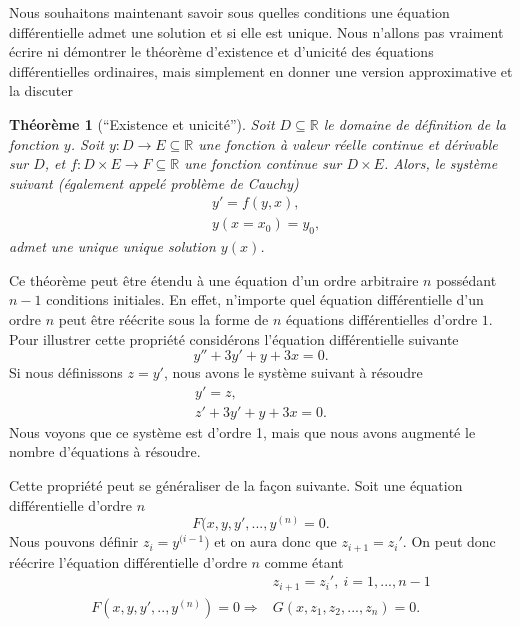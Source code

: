 \documentclass[a4paper,12pt]{book}
\newcommand{\real}{\mathbb{R}}
\newtheorem{theoreme}{Théorème}
\begin{document}
Nous souhaitons maintenant savoir sous quelles conditions une équation différentielle admet une solution 
et si elle est unique. Nous n'allons pas vraiment écrire ni démontrer le théorème 
d'existence et d'unicité des équations différentielles ordinaires, mais simplement en donner une 
version approximative et la discuter
\begin{theoreme}[``Existence et unicité'']
 Soit $D\subseteq\real$ le domaine de définition de la fonction $y$. Soit  
 $y:D\rightarrow E\subseteq \real$ une fonction à valeur réelle continue et dérivable sur $D$, 
 et $f:D\times E\rightarrow F\subseteq\real$ une fonction continue sur $D\times E$. 
 Alors, le système suivant (également appelé problème de Cauchy)
 \begin{align}
  &y'=f(y,x),\\
  &y(x=x_0)=y_0,
 \end{align}
admet une unique unique solution $y(x)$.
\end{theoreme}
Ce théorème peut être étendu à une équation d'un ordre arbitraire $n$ possédant $n-1$
conditions initiales. En effet, n'importe quel équation différentielle d'un ordre $n$
peut être réécrite sous la forme de $n$ équations différentielles d'ordre $1$.
Pour illustrer cette propriété considérons l'équation différentielle suivante
\begin{equation}
 y''+3y'+y+3x=0.
\end{equation}
Si nous définissons $z=y'$, nous avons le système suivant à résoudre
\begin{align}
 y'=z,\\
 z'+3y'+y+3x=0.
\end{align}
Nous voyons que ce système est d'ordre 1, mais que nous avons augmenté le nombre d'équations à résoudre.

Cette propriété peut se généraliser de la façon suivante. 
Soit une équation différentielle d'ordre $n$
\begin{equation}
 F(x,y,y',...,y^{(n)}=0.
\end{equation}
Nous pouvons définir $z_i=y^{(i-1})$ et on aura donc que $z_{i+1}=z_i'$. On peut donc 
réécrire l'équation différentielle d'ordre $n$ comme étant 
\begin{align}
 &z_{i+1}=z_i',\ i=1,...,n-1\\
 F(x,y,y',..,y^{(n)})=0 \Rightarrow &G(x,z_1,z_2,...,z_n)=0.
\end{align}
\end{document}
